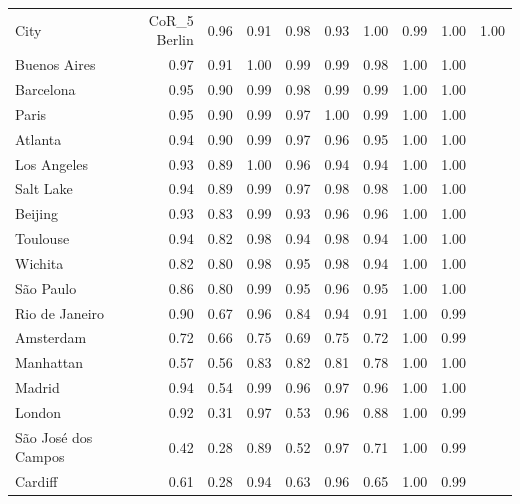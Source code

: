 \begin{tabular}{lrrrrrrrr}
\toprule
City & CoR_5%
\midrule
Berlin & 0.96 & 0.91 & 0.98 & 0.93 & 1.00 & 0.99 & 1.00 & 1.00 \\
Buenos Aires & 0.97 & 0.91 & 1.00 & 0.99 & 0.99 & 0.98 & 1.00 & 1.00 \\
Barcelona & 0.95 & 0.90 & 0.99 & 0.98 & 0.99 & 0.99 & 1.00 & 1.00 \\
Paris & 0.95 & 0.90 & 0.99 & 0.97 & 1.00 & 0.99 & 1.00 & 1.00 \\
Atlanta & 0.94 & 0.90 & 0.99 & 0.97 & 0.96 & 0.95 & 1.00 & 1.00 \\
Los Angeles & 0.93 & 0.89 & 1.00 & 0.96 & 0.94 & 0.94 & 1.00 & 1.00 \\
Salt Lake & 0.94 & 0.89 & 0.99 & 0.97 & 0.98 & 0.98 & 1.00 & 1.00 \\
Beijing & 0.93 & 0.83 & 0.99 & 0.93 & 0.96 & 0.96 & 1.00 & 1.00 \\
Toulouse & 0.94 & 0.82 & 0.98 & 0.94 & 0.98 & 0.94 & 1.00 & 1.00 \\
Wichita & 0.82 & 0.80 & 0.98 & 0.95 & 0.98 & 0.94 & 1.00 & 1.00 \\
São Paulo & 0.86 & 0.80 & 0.99 & 0.95 & 0.96 & 0.95 & 1.00 & 1.00 \\
Rio de Janeiro & 0.90 & 0.67 & 0.96 & 0.84 & 0.94 & 0.91 & 1.00 & 0.99 \\
Amsterdam & 0.72 & 0.66 & 0.75 & 0.69 & 0.75 & 0.72 & 1.00 & 0.99 \\
Manhattan & 0.57 & 0.56 & 0.83 & 0.82 & 0.81 & 0.78 & 1.00 & 1.00 \\
Madrid & 0.94 & 0.54 & 0.99 & 0.96 & 0.97 & 0.96 & 1.00 & 1.00 \\
London & 0.92 & 0.31 & 0.97 & 0.53 & 0.96 & 0.88 & 1.00 & 0.99 \\
São José dos Campos & 0.42 & 0.28 & 0.89 & 0.52 & 0.97 & 0.71 & 1.00 & 0.99 \\
Cardiff & 0.61 & 0.28 & 0.94 & 0.63 & 0.96 & 0.65 & 1.00 & 0.99 \\
\bottomrule
\end{tabular}

